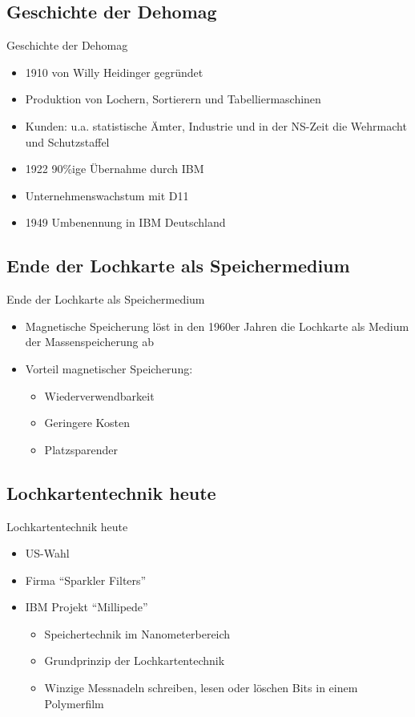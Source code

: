 \documentclass[EU2]{beamer}
\begin{document}
\subsection{Geschichte der Dehomag}
\begin{frame}{Geschichte der Dehomag}
    \begin{itemize}
      \item 1910 von Willy Heidinger gegründet
      \item Produktion von Lochern, Sortierern und Tabelliermaschinen
      \item Kunden: u.a. statistische Ämter, Industrie und in der NS-Zeit die Wehrmacht und Schutzstaffel
      \item 1922 90\%ige Übernahme durch IBM
      \item Unternehmenswachstum mit D11
      \item 1949 Umbenennung in IBM Deutschland
    \end{itemize}
\end{frame}

\subsection{Ende der Lochkarte als Speichermedium}
\begin{frame}{Ende der Lochkarte als Speichermedium}
  \begin{itemize}
    \item Magnetische Speicherung löst in den 1960er Jahren die Lochkarte als Medium der Massenspeicherung ab
    \item Vorteil magnetischer Speicherung:
        \begin{itemize}
          \item Wiederverwendbarkeit
          \item Geringere Kosten
	  \item Platzsparender
       \end{itemize}
 \end{itemize}
\end{frame}

\subsection{Lochkartentechnik heute}
\begin{frame}{Lochkartentechnik heute}
  \begin{itemize}
    \item US-Wahl
    \item Firma \enquote{Sparkler Filters}
    \item IBM Projekt \enquote{Millipede}
        \begin{itemize}
          \item Speichertechnik im Nanometerbereich
          \item Grundprinzip der Lochkartentechnik
	  \item Winzige Messnadeln schreiben, lesen oder löschen Bits in einem Polymerfilm
       \end{itemize}
  \end{itemize}
\end{frame}
\end{document}

